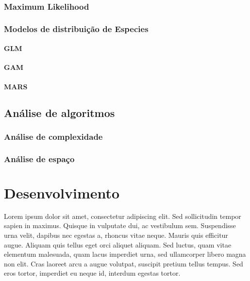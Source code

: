 \documentclass[
	12pt,				%
	openright,			%
	oneside,			%
	a4paper,			%
	english,			%
	brazil				%
	]{abntex2}
\begin{document}
\subsection{Maximum Likelihood}
\subsection{Modelos de distribuição de Especies}
\subsubsection{GLM}
\subsubsection{GAM}
\subsubsection{MARS}
\section{Análise de algoritmos}
\subsection{Análise de complexidade}
\subsection{Análise de espaço}

 \chapter{Desenvolvimento}

 Lorem ipsum dolor sit amet, consectetur adipiscing elit. Sed sollicitudin tempor sapien in maximus. Quisque in vulputate dui, ac vestibulum sem. Suspendisse urna velit, dapibus nec egestas a, rhoncus vitae neque. Mauris quis efficitur augue. Aliquam quis tellus eget orci aliquet aliquam. Sed luctus, quam vitae elementum malesuada, quam lacus imperdiet urna, sed ullamcorper libero magna non elit. Cras laoreet arcu a augue volutpat, suscipit pretium tellus tempus. Sed eros tortor, imperdiet eu neque id, interdum egestas tortor.

\end{document}
